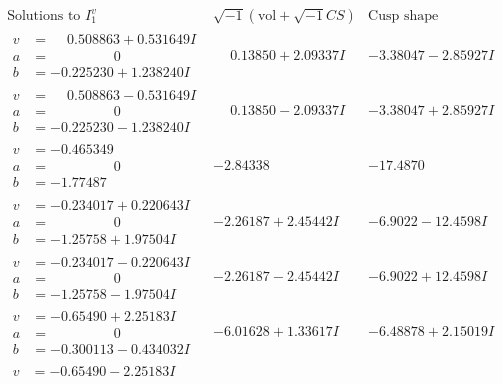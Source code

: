 \documentclass[1p]{elsarticle_modified}
\theoremstyle{definition}
\newcommand{\I}{\sqrt{-1}}
\begin{document}
$$\begin{array}{c|c|c}  
\text{Solutions to }I^v_{1}& \I (\text{vol} + \sqrt{-1}CS) & \text{Cusp shape}\\
 \hline 
\begin{aligned}
v &= \phantom{-}0.508863 + 0.531649 I \\
a &= \phantom{-0.000000 } 0 \\
b &= -0.225230 + 1.238240 I\end{aligned}
 & \phantom{-}0.13850 + 2.09337 I & -3.38047 - 2.85927 I \\ \hline\begin{aligned}
v &= \phantom{-}0.508863 - 0.531649 I \\
a &= \phantom{-0.000000 } 0 \\
b &= -0.225230 - 1.238240 I\end{aligned}
 & \phantom{-}0.13850 - 2.09337 I & -3.38047 + 2.85927 I \\ \hline\begin{aligned}
v &= -0.465349\phantom{ +0.000000I} \\
a &= \phantom{-0.000000 } 0 \\
b &= -1.77487\phantom{ +0.000000I}\end{aligned}
 & -2.84338\phantom{ +0.000000I} & -17.4870\phantom{ +0.000000I} \\ \hline\begin{aligned}
v &= -0.234017 + 0.220643 I \\
a &= \phantom{-0.000000 } 0 \\
b &= -1.25758 + 1.97504 I\end{aligned}
 & -2.26187 + 2.45442 I & -6.9022 - 12.4598 I \\ \hline\begin{aligned}
v &= -0.234017 - 0.220643 I \\
a &= \phantom{-0.000000 } 0 \\
b &= -1.25758 - 1.97504 I\end{aligned}
 & -2.26187 - 2.45442 I & -6.9022 + 12.4598 I \\ \hline\begin{aligned}
v &= -0.65490 + 2.25183 I \\
a &= \phantom{-0.000000 } 0 \\
b &= -0.300113 - 0.434032 I\end{aligned}
 & -6.01628 + 1.33617 I & -6.48878 + 2.15019 I \\ \hline\begin{aligned}
v &= -0.65490 - 2.25183 I \\

\end{aligned}
\end{array}$$
\end{document}
